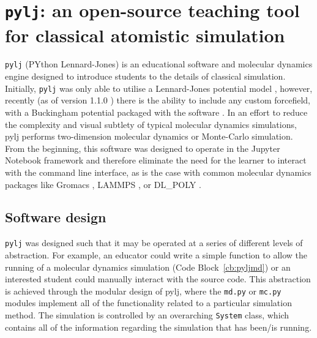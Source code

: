\section{\texttt{pylj}: an open-source teaching tool for classical atomistic simulation}

\texttt{pylj} (PYthon Lennard-Jones) \cite{mccluskey_pylj_2018,mccluskey_arm61/pylj_2019-2} is an educational software and molecular dynamics engine designed to introduce students to the details of classical simulation.
Initially, \texttt{pylj} was only able to utilise a Lennard-Jones potential model \cite{lennard-jones_determination_1924}, however, recently (as of version 1.1.0 \cite{mccluskey_arm61/pylj_2018}) there is the ability to include any custom forcefield, with a Buckingham potential packaged with the software \cite{buckingham_classical_1938}.
In an effort to reduce the complexity and visual subtlety of typical molecular dynamics simulations, pylj performs two-dimension molecular dynamics or Monte-Carlo simulation.
From the beginning, this software was designed to operate in the Jupyter Notebook framework and therefore eliminate the need for the learner to interact with the command line interface, as is the case with common molecular dynamics packages like Gromacs \cite{berendsen_gromacs_1995}, LAMMPS \cite{plimpton_fast_1995}, or DL\_POLY \cite{smith_dl_poly_2002}.

\subsection{Software design}
\texttt{pylj} was designed such that it may be operated at a series of different levels of abstraction.
For example, an educator could write a simple function to allow the running of a molecular dynamics simulation (Code Block~\ref{cb:pyljmd}) or an interested student could manually interact with the source code.
This abstraction is achieved through the modular design of pylj, where the \texttt{md.py} or \texttt{mc.py} modules implement all of the functionality related to a particular simulation method.
The simulation is controlled by an overarching \texttt{System} class, which contains all of the information regarding the simulation that has been/is running.
%
\begin{figure}
    \centering
        
\end{figure}
%

